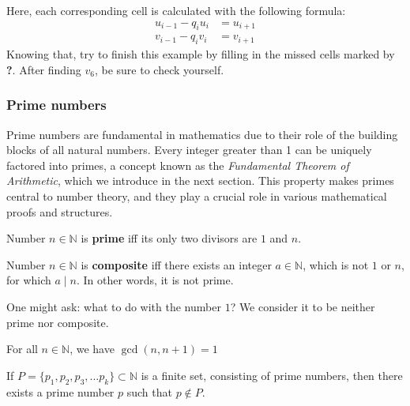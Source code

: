 \documentclass[../lecture-notes.tex]{subfiles}
\begin{document}
\begin{example} 
\begin{minipage}{0.7\textwidth}
{\begin{tabular}{|c|c|c|c|c|c|c|c|}
                \hline
            \end{tabular}
        }
    \end{minipage}

    \hfill
    
    Here, each corresponding cell is calculated with the following formula: 
    \begin{align*}
        u_{i-1} - q_i u_i &= u_{i+1} \\
        v_{i-1} - q_i v_i &= v_{i+1} 
    \end{align*}
    Knowing that, try to finish this example by filling in the missed cells
    marked by \textcolor{green!60!black}{\textbf{?}}. After finding $v_6$, be
    sure to check yourself.
\end{example}

\subsubsection{Prime numbers}

Prime numbers are fundamental in mathematics due to their role of the building
blocks of all natural numbers. Every integer greater than 1 can be uniquely
factored into primes, a concept known as the \emph{Fundamental Theorem of
Arithmetic}, which we introduce in the next section. This property makes primes
central to number theory, and they play a crucial role in various mathematical
proofs and structures.

\begin{definition}
    Number $n \in \mathbb{N}$ is \textbf{prime} iff its only two divisors are $1$
    and $n$. 
\end{definition}

\begin{definition}
    Number $n \in \mathbb{N}$ is \textbf{composite} iff there exists an integer
    $a \in \mathbb{N}$, which is not $1$ or $n$, for which $a \mid n$. In other words,
    it is not prime.
\end{definition}

\begin{remark}
    One might ask: what to do with the number $1$? We consider it to
    be neither prime nor composite.
\end{remark}

\begin{lemma}
    For all $n \in \mathbb{N}$, we have $\gcd(n, n+1) = 1$
\end{lemma}

\begin{theorem} 
    If $P = \{p_1, p_2, p_3, \dots p_k\} \subset \mathbb{N}$ is a finite set,
    consisting of prime numbers, then there exists a prime number $p$ such that
    $p \notin P$.
\end{theorem}
\end{document}
